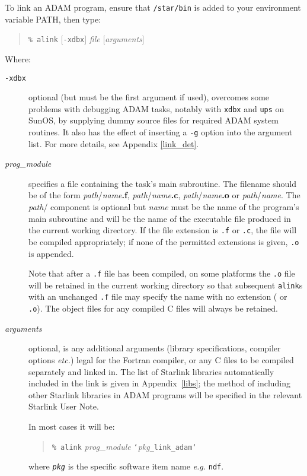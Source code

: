 \documentclass[twoside,11pt,nolof]{starlink}
\begin{document}
To link an ADAM program, ensure that \texttt{/star/bin} is added to your
environment variable PATH, then type:
\begin{quote}
\texttt{\% alink} [{\texttt{-xdbx}}] {\textit{file}} [{\textit{arguments}}]
\end{quote}
Where:
\begin{description}
\item[{\texttt{-xdbx}}] optional (but must be the first argument if used),
overcomes some problems with debugging ADAM tasks, notably with \texttt{xdbx}
and \texttt{ups} on SunOS, by supplying dummy source files for required ADAM
system routines. It also has the effect of inserting a \texttt{-g} option into
the argument list. For more details, see Appendix \ref{link_det}.
\item[\textit{prog\_module}] specifies a file containing the task's main
subroutine. The filename should be of the form
{\textit{path}/\textit{name}\bf{.f}}, {\textit{path}/\textit{name}\bf{.c}},
{\textit{path}/\textit{name}\bf{.o}} or  {\textit{path}/\textit{name}}.
The \textit{path}/ component is optional but
\textit{name} must be the name of the program's main subroutine and will
be the name of the executable file produced in the current working directory.
If the file extension is \texttt{.f} or \texttt{.c}, the file will be compiled
appropriately; if none of the permitted extensions is given,
\texttt{.o} is appended.

Note that after a \texttt{.f} file has been compiled, on some platforms the
\texttt{.o} file will be retained in the current working directory so that
subsequent \texttt{alink}s with an unchanged \texttt{.f} file may specify the
name with no extension ( or \texttt{.o}).
The object files for any compiled C files will always be retained.
\item[\textit{arguments}] optional, is any additional arguments (library
specifications, compiler options \textit{etc.}) legal for the Fortran
compiler, or any C files to be compiled separately and linked in.
The list of Starlink libraries automatically included in the link is given in
Appendix~\ref{libs}; the method of including other Starlink libraries in ADAM
programs will be specified in the relevant Starlink User Note.

In most cases it will be:
\begin{quote}
\texttt{\% alink} {\textit{prog\_module} \texttt{`}\textit{pkg}\texttt{\_link\_adam`}}
\end{quote}
where \texttt{\textit{pkg}} is the specific software item name \textit{e.g.}
\texttt{ndf}.
\end{description}
\end{document}
